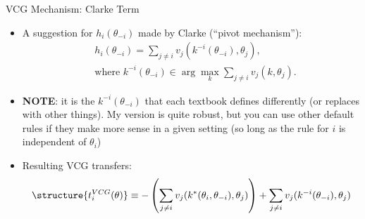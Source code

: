 \documentclass[english,10pt
,aspectratio=169
]{beamer}
\begin{document}
\begin{frame}{VCG Mechanism: Clarke Term}
\begin{itemize}
	\item A suggestion for $h_i(\theta_{-i})$ made by Clarke (``pivot mechanism''):
	\vspace{-0.5em}\begin{align*}
	&h_{i}(\theta_{-i})=\sum_{j\neq i} v_{j}(k^{-i}(\theta_{-i}),\theta_{j}),
	\\ &\text{where } k^{-i}(\theta_{-i}) \in \arg\max_{k} \sum_{j\neq i}v_{j}(k,\theta_{j}).
	\end{align*}

	\item \textbf{NOTE}: it is the  $k^{-i}(\theta_{-i})$ that each textbook defines differently (or replaces with other things). My version is quite robust, but you can use other default rules if they make more sense in a given setting (so long as the rule for $i$ is independent of $\theta_i$)
	
	\item Resulting \alert{VCG transfers}:
	\vspace{-0.5em}\begin{align*}
	\structure{ t_{i}^{VCG}(\theta) } \equiv -\left(\sum_{j\neq i} v_{j}(k^*(\theta_i, \theta_{-i}), \theta_{j}) \right) + \sum_{j\neq i} v_{j}(k^{-i}(\theta_{-i}), \theta_{j})
	\end{align*}
\end{itemize}
\end{frame}
\end{document}
